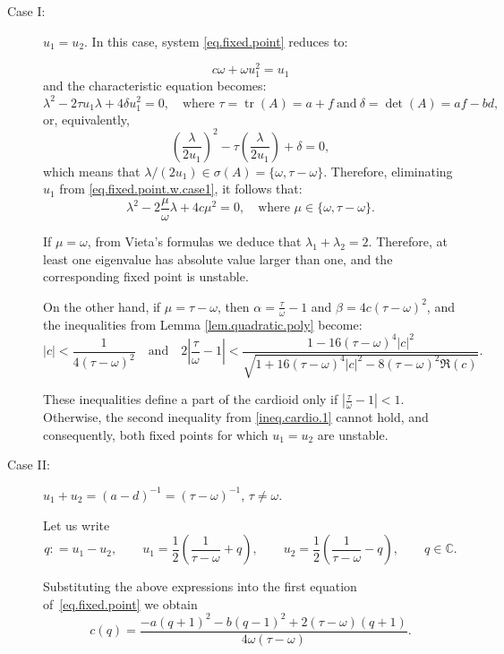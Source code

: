 \documentclass[10pt]{article}
\DeclareMathOperator{\tr}{tr}
\begin{document}
\begin{description}
\item[Case I:] $u_1=u_2$. In this case, system \eqref{eq.fixed.point} reduces to:

\begin{equation} \label{eq.fixed.point.w.case1}
c\omega +\omega u_1^2=u_1
\end{equation}
and the characteristic equation becomes:
\[
\lambda^2 - 2 \tau u_1 \lambda + 4 \delta u_1^2 = 0,
\quad \text{where } \tau = \tr(A) = a + f ~\text{and}~\delta=\det(A)=af-bd,
\]
or, equivalently,
\[
\left(\frac{\lambda}{2 u_1}\right)^2
- \tau \left(\frac{\lambda}{2 u_1}\right)
+ \delta = 0,
\]
which means that $\lambda / (2 u_1) \in \sigma(A) = \{\omega, \tau - \omega\}$. Therefore, eliminating $u_1$ from \eqref{eq.fixed.point.w.case1}, it follows that:
\[
\lambda^2 - 2 \frac{\mu}{\omega} \lambda + 4 c \mu^2 = 0,
\quad \text{where } \mu \in \{\omega,\tau-\omega\}.
\]

If $\mu=\omega$, from Vieta's formulas we deduce that $\lambda_1+\lambda_2=2$. Therefore, at least one eigenvalue has absolute value larger than one, and the corresponding fixed point is unstable.

On the other hand, if $\mu = \tau - \omega$, then $\alpha = \frac{\tau}{\omega} - 1$ and $\beta = 4 c (\tau - \omega)^2$, and the inequalities from Lemma \ref{lem.quadratic.poly} become:
\begin{equation}\label{ineq.cardio.1}
|c| < \frac{1}{4 (\tau - \omega)^2}
\quad \text{and} \quad
2 \left|\frac{\tau}{\omega} - 1\right|
< \frac{1 - 16 (\tau - \omega)^4 |c|^2}
       {\sqrt{1 + 16 (\tau - \omega)^4 |c|^2 - 8 (\tau - \omega)^2 \Re(c)}}.
\end{equation}

These inequalities define a part of the cardioid only if $\left|\frac{\tau}{\omega} - 1\right| < 1$. Otherwise, the second inequality from \eqref{ineq.cardio.1} cannot hold, and consequently, both fixed points for which $u_1=u_2$ are unstable.


\item[Case II:] $u_1+u_2=(a-d)^{-1}=(\tau-\omega)^{-1}$, $\tau\neq\omega$.

Let us write
\[
q : = u_1 - u_2,
\qquad
u_1 = \frac{1}{2} \left(\frac{1}{\tau - \omega} + q\right),
\qquad
u_2 = \frac{1}{2} \left(\frac{1}{\tau - \omega} - q\right),
\qquad q \in \mathbb{C}.
\]

Substituting the above expressions into the first equation of~\eqref{eq.fixed.point} we obtain
\begin{equation}\label{eq.c.case2}
c(q) = \frac{-a (q + 1)^{2}-b (q - 1)^2 + 2 (\tau - \omega) (q + 1)}
            {4 \omega (\tau - \omega)} .
\end{equation}


\end{description}
\end{document}
